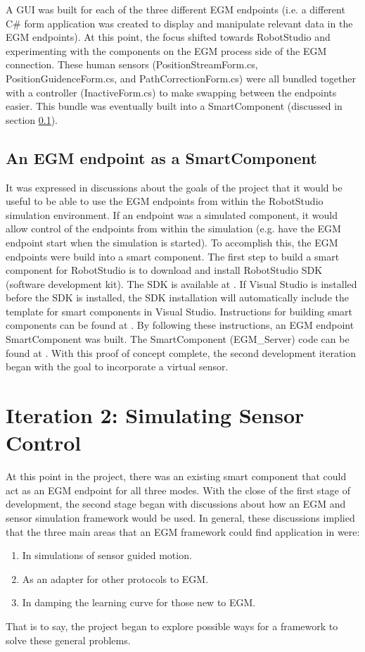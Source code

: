 \documentclass{cslthse-msc}
\begin{document}
A GUI was built for each of the three different EGM endpoints (i.e. a different C\# form application was created to display and manipulate relevant data in the EGM endpoints). At this point, the focus shifted towards RobotStudio and experimenting with the components on the EGM process side of the EGM connection. These human sensors (PositionStreamForm.cs, PositionGuidenceForm.cs, and PathCorrectionForm.cs) were all bundled together with a controller (InactiveForm.cs) to make swapping between the endpoints easier. This bundle was eventually built into a SmartComponent (discussed in section \ref{sec:Dev:I1:smart_comp}).



\subsection{An EGM endpoint as a SmartComponent}
\label{sec:Dev:I1:smart_comp}
It was expressed in discussions about the goals of the project that it would be useful to be able to use the EGM endpoints from within the RobotStudio simulation environment. If an endpoint was a simulated component, it would allow control of the endpoints from within the simulation (e.g. have the EGM endpoint start when the simulation is started). To accomplish this, the EGM endpoints were build into a smart component. The first step to build a smart component for RobotStudio is to download and install RobotStudio SDK (software development kit). The SDK is available at \cite{ABB:RS_SDK}. If Visual Studio is installed before the SDK is installed, the SDK installation will automatically include the template for smart components in Visual Studio. Instructions for building smart components can be found at \cite{ABB:Smart_Components}. By following these instructions, an EGM endpoint SmartComponent was built. The SmartComponent (EGM\_Server) code can be found at \cite{Greg:Sensor}. With this proof of concept complete, the second development iteration began with the goal to incorporate a virtual sensor.


\section{Iteration 2: Simulating Sensor Control}
\label{sec:Dev:I2}
At this point in the project, there was an existing smart component that could act as an EGM endpoint for all three modes. With the close of the first stage of development, the second stage began with discussions about how an EGM and sensor simulation framework would be used. In general, these discussions implied that the three main areas that an EGM framework could find application in were:
\begin{enumerate}
    \item In simulations of sensor guided motion.
    \item As an adapter for other protocols to EGM.
    \item In damping the learning curve for those new to EGM. 
\end{enumerate}
That is to say, the project began to explore possible ways for a framework to solve these general problems. 
\end{document}
